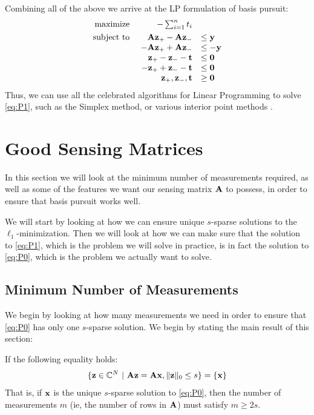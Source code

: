 Combining all of the above we arrive at the LP formulation of basis pursuit:
\begin{equation}
	\begin{array}{r r l l}
		\underset{}{\text{maximize}}~ & -\sum_{i=1}^{n} t_{i}         &          &  \\
		 \quad\operatorname*{subject~to}~ & \mathbf{A}\mathbf{z}_{+} - \mathbf{A}\mathbf{z}_{-}           & \leq \mathbf{y}  &  \\
		            & -\mathbf{A}\mathbf{z}_{+} + \mathbf{A}\mathbf{z}_{-}          & \leq -\mathbf{y} &  \\
		            & \mathbf{z}_{+} - \mathbf{z}_{-} - \mathbf{t}  & \leq \mathbf{0}  &  \\
		            & -\mathbf{z}_{+} + \mathbf{z}_{-} - \mathbf{t} & \leq \mathbf{0}  &  \\
		            & \mathbf{z}_{+}, \mathbf{z}_{-}, \mathbf{t}    & \geq \mathbf{0}   &
	\end{array}
\end{equation}
Thus, we can use all the celebrated algorithms for Linear Programming to solve \eqref{eq:P1}, such as the Simplex method, or various interior point methods \cite{vanderbei14linprog}.










\section{Good Sensing Matrices}
\label{sec:goodmatrices}
In this section we will look at the minimum number of measurements required, as well as some of the features we want our sensing matrix $ \mathbf{A} $ to possess, in order to ensure that basis pursuit works well. 

We will start by looking at how we can ensure unique $ s $-sparse solutions to the $ \ell_{1} $-minimization. Then we will look at how we can make sure that the solution to \eqref{eq:P1}, which is the problem we will solve in practice, is in fact the solution to \eqref{eq:P0}, which is the problem we actually want to solve. 





\subsection{Minimum Number of Measurements}
\label{sec:minimum_measurements}
We begin by looking at how many measurements we need in order to ensure that \eqref{eq:P0} has only one $ s $-sparse solution. We begin by stating the main result of this section:
\begin{theorem}
	\label{thm:minimum_measurements}
	If the following equality holds: \[ \{\mathbf{z} \in \mathbb{C}^{N} ~|~ \mathbf{A}\mathbf{z} = \mathbf{A}\mathbf{x}, \lVert\mathbf{z}\rVert_{0} \leq s\}  = \{\mathbf{x}\} \] That is, if $ \mathbf{x} $ is the unique $ s $-sparse solution to \eqref{eq:P0}, then the number of measurements $ m $ (ie, the number of rows in $ \mathbf{A} $) must satisfy $ m \geq 2s $.
\end{theorem}

